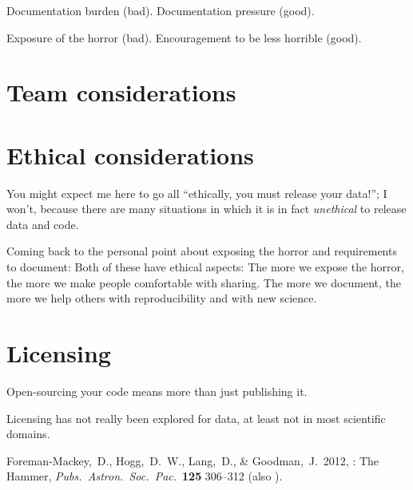 \documentclass[12pt,twoside,pdftex]{article}
\begin{document}
Documentation burden (bad). Documentation pressure (good).

Exposure of the horror (bad). Encouragement to be less horrible (good).

\section{Team considerations}

\section{Ethical considerations}

You might expect me here to go all ``ethically, you must release your
data!''; I won't, because there are many situations in which it is in
fact \emph{unethical} to release data and code.

Coming back to the personal point about exposing the horror and
requirements to document: Both of these have ethical aspects: The more
we expose the horror, the more we make people comfortable with
sharing. The more we document, the more we help others with
reproducibility and with new science.

\section{Licensing}

Open-sourcing your code means more than just publishing it.

Licensing has not really been explored for data, at least not in most
scientific domains.

\clearpage
{}\theendnotes

\clearpage
\raggedright
\begin{thebibliography}{}
  Foreman-Mackey,~D., Hogg,~D.~W., Lang,~D., \& Goodman,~J.\ 2012,
  : The  Hammer,
  \textit{Pubs.\ Astron.\ Soc.\ Pac.}\ \textbf{125} 306--312
  (also ).
\end{thebibliography}
\end{document}

